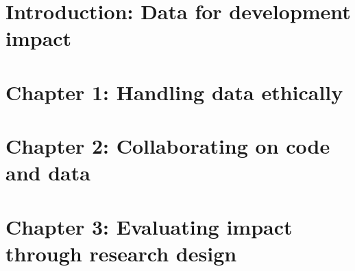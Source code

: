 %
%
%
%




\cleardoublepage
\chapter{Introduction: Data for development impact} %





\chapter{Chapter 1: Handling data ethically}
\label{ch:1}




\chapter{Chapter 2: Collaborating on code and data}
\label{ch:2}




\chapter{Chapter 3: Evaluating impact through research design}
\label{ch:3}


